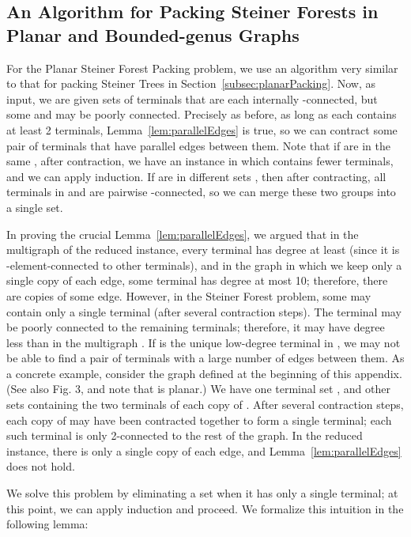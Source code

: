 \documentclass[11pt]{article}
\begin{document}
\subsection{An Algorithm for Packing Steiner Forests in Planar and
  Bounded-genus Graphs}
\label{subsec:forestPacking}

For the Planar Steiner Forest Packing problem, we use an algorithm
very similar to that for packing Steiner Trees in
Section~\ref{subsec:planarPacking}. Now, as input, we are given sets
 of terminals that are each internally -connected,
but some  and  may be poorly connected. Precisely as before,
as long as each  contains at least 2 terminals,
Lemma~\ref{lem:parallelEdges} is true, so we can contract some pair of
terminals  that have  parallel edges between
them. Note that if  are in the same , after
contraction, we have an instance in which  contains fewer
terminals, and we can apply induction. If  are in different
sets , then after contracting, all terminals in  and
 are pairwise -connected, so we can merge these two groups
into a single set.

In proving the crucial Lemma~\ref{lem:parallelEdges}, we argued that
in the multigraph  of the reduced instance, every terminal has
degree at least  (since it is -element-connected to other
terminals), and in the graph  in which we keep only a single copy
of each edge, some terminal has degree at most 10; therefore, there
are  copies of some edge. However, in the Steiner Forest
problem, some  may contain only a single terminal  (after
several contraction steps). The terminal  may be poorly connected
to the remaining terminals; therefore, it may have degree less than
 in the multigraph . If  is the unique low-degree terminal in
, we may not be able to find a pair of terminals with a large
number of edges between them. As a concrete example, consider the
graph  defined at the beginning of this appendix. (See also
Fig. 3, and note that  is planar.) We have one terminal set , and other sets  containing the two terminals of each
copy of . After several contraction steps, each copy of  may
have been contracted together to form a single terminal; each such
terminal is only 2-connected to the rest of the graph. In the reduced
instance, there is only a single copy of each edge, and
Lemma~\ref{lem:parallelEdges} does not hold. 

We solve this problem by eliminating a set  when it has only a
single terminal; at this point, we can apply induction and proceed. We
formalize this intuition in the following lemma:
\end{document}
